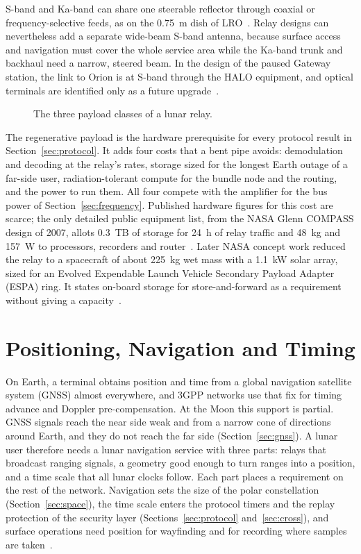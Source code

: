 \documentclass{IEEEoj}
\begin{document}
S-band and Ka-band can share one steerable reflector through coaxial or frequency-selective feeds, as on the \SI{0.75}{m} dish of LRO~\cite{lro_ka_analysis}. Relay designs can nevertheless add a separate wide-beam S-band antenna, because surface access and navigation must cover the whole service area while the Ka-band trunk and backhaul need a narrow, steered beam. In the design of the paused Gateway station, the link to Orion is at S-band through the HALO equipment, and optical terminals are identified only as a future upgrade~\cite{gateway_comm}.



\begin{figure}[!t]
\centering
\resizebox{\textwidth}{!}{}
\caption{The three payload classes of a lunar relay.}
\label{fig:payload}
\end{figure}
The regenerative payload is the hardware prerequisite for every protocol result in Section~\ref{sec:protocol}. It adds four costs that a bent pipe avoids: demodulation and decoding at the relay's rates, storage sized for the longest Earth outage of a far-side user, radiation-tolerant compute for the bundle node and the routing, and the power to run them. All four compete with the amplifier for the bus power of Section~\ref{sec:frequency}. Published hardware figures for this cost are scarce; the only detailed public equipment list, from the NASA Glenn COMPASS design of 2007, allots \SI{0.3}{TB} of storage for \SI{24}{h} of relay traffic and \SI{48}{kg} and \SI{157}{W} to processors, recorders and router~\cite{oleson2012compass}. Later NASA concept work reduced the relay to a spacecraft of about \SI{225}{kg} wet mass with a \SI{1.1}{kW} solar array, sized for an Evolved Expendable Launch Vehicle Secondary Payload Adapter (ESPA) ring. It states on-board storage for store-and-forward as a requirement without giving a capacity~\cite{lcrns_esper2025}. 



\section{Positioning, Navigation and Timing}
\label{sec:pnt}
On Earth, a terminal obtains position and time from a global navigation satellite system (GNSS) almost everywhere, and 3GPP networks use that fix for timing advance and Doppler pre-compensation. At the Moon this support is partial. GNSS signals reach the near side weak and from a narrow cone of directions around Earth, and they do not reach the far side (Section~\ref{sec:gnss}). A lunar user therefore needs a lunar navigation service with three parts: relays that broadcast ranging signals, a geometry good enough to turn ranges into a position, and a time scale that all lunar clocks follow. Each part places a requirement on the rest of the network. Navigation sets the size of the polar constellation (Section~\ref{sec:space}), the time scale enters the protocol timers and the replay protection of the security layer (Sections~\ref{sec:protocol} and~\ref{sec:cross}), and surface operations need position for wayfinding and for recording where samples are taken~\cite{nasa_moonbase_ug2026}.
\end{document}
